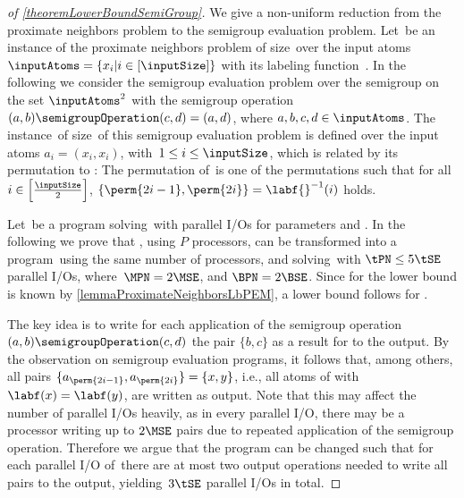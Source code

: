 \documentclass[envcountsame]{llncs}
\begin{document}
\begin{proof}[of \autoref{theoremLowerBoundSemiGroup}]
We give a non-uniform reduction from the proximate neighbors problem to the semigroup evaluation problem.
Let~\instPN be an instance of the proximate neighbors problem of size~ over the input atoms \mbox{$\inputAtoms=\{x_i|i\in[\inputSize]\}$} with its labeling function~\labf.
In the following we consider the semigroup evaluation problem over the semigroup on the set $\inputAtoms^2$ with the semigroup operation $(a,b)\semigroupOperation(c,d) = (a,d)$, where $a,b,c,d\in \inputAtoms$.
The instance~\instSE of size~ of this semigroup evaluation problem is defined over the input atoms $a_i=(x_i,x_i)$, with~\mbox{$1\leq i\leq \inputSize$}, which is related by its permutation to \instPN: The permutation \perm{} of~\instSE is one of the permutations such that for all $i\in\left[\frac{\inputSize}{2}\right]$, $\{\perm{2i-1},\perm{2i}\} = \labf{}^{-1}(i)$ holds.

Let~\progSE be a program solving~\instSE with \tSE{} parallel I/Os for parameters \MSE and \BSE.
In the following we prove that \progSE, using $P$ processors, can be transformed into a program~\progPN  using the same number of processors, and solving~\instPN with $\tPN \leq 5\tSE$ parallel I/Os, where~\mbox{$\MPN=2\MSE$}, and $\BPN=2\BSE$.
Since for \tPN the lower bound is known by \autoref{lemmaProximateNeighborsLbPEM}, a lower bound follows for \tSE.

The key idea is to write for each application of the semigroup \linebreak oper\-ation~\mbox{$(a,b)\semigroupOperation(c,d)$} the pair $\{b,c\}$ as a result for \instPN to the output. 
By the observation on semigroup evaluation programs, it follows that, among others, all pairs $\{a_{\perm{2i-1}},a_{\perm{2i}}\} = \{x,y\}$, i.e., all atoms of \instPN with $\labf(x) = \labf(y)$, are written as output.
Note that this may affect the number of parallel I/Os heavily, as in every parallel I/O, there may be a processor writing up to $2\MSE$ pairs due to repeated application of the semigroup operation.
Therefore we argue that the program can be changed such that for each parallel I/O of~\progSE there are at most two output operations needed to write all pairs to the output, yielding~\mbox{$3\tSE$} parallel I/Os in total.


\end{proof}
\end{document}
